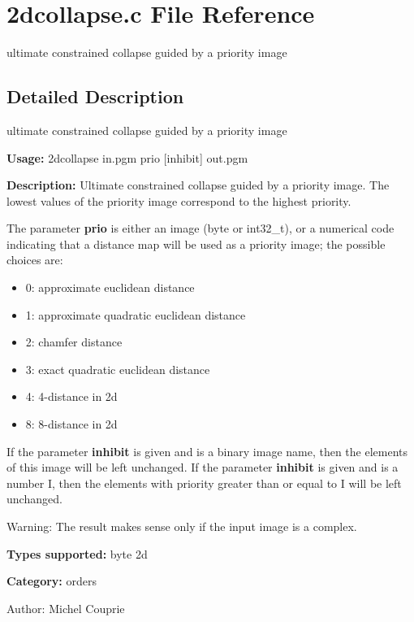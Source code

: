 \section{2dcollapse.c File Reference}
\label{2dcollapse_8c}
ultimate constrained collapse guided by a priority image  




\label{_details}
\subsection{Detailed Description}
ultimate constrained collapse guided by a priority image 

{\bf Usage:} 2dcollapse in.pgm prio [inhibit] out.pgm

{\bf Description:} Ultimate constrained collapse guided by a priority image. The lowest values of the priority image correspond to the highest priority.

The parameter {\bf prio} is either an image (byte or int32\_\-t), or a numerical code indicating that a distance map will be used as a priority image; the possible choices are: \begin{itemize}
\item 0: approximate euclidean distance \item 1: approximate quadratic euclidean distance \item 2: chamfer distance \item 3: exact quadratic euclidean distance \item 4: 4-distance in 2d \item 8: 8-distance in 2d\end{itemize}
If the parameter {\bf inhibit} is given and is a binary image name, then the elements of this image will be left unchanged. If the parameter {\bf inhibit} is given and is a number I, then the elements with priority greater than or equal to I will be left unchanged.

\begin{Desc}
\item[Warning:]The result makes sense only if the input image is a complex.\end{Desc}
{\bf Types supported:} byte 2d

{\bf Category:} orders

\begin{Desc}
\item[Author:]Michel Couprie \end{Desc}
